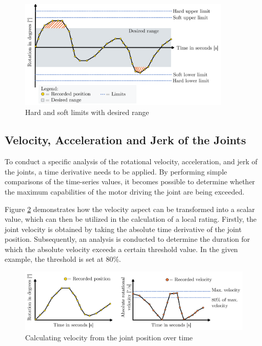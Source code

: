 \begin{figure}[H]
	\centerline{\includegraphics[width=0.9\textwidth]{figures/limits.png}}
	\caption{Hard and soft limits with desired range}
	\label{limits}
\end{figure}

\subsection{Velocity, Acceleration and Jerk of the Joints}\label{VAJJ}
To conduct a specific analysis of the rotational velocity, acceleration, and jerk of the joints, a time derivative needs to be applied. By performing simple comparisons of the time-series values, it becomes possible to determine whether the maximum capabilities of the motor driving the joint are being exceeded.

Figure \ref{velo} demonstrates how the velocity aspect can be transformed into a scalar value, which can then be utilized in the calculation of a local rating. Firstly, the joint velocity is obtained by taking the absolute time derivative of the joint position. Subsequently, an analysis is conducted to determine the duration for which the absolute velocity exceeds a certain threshold value. In the given example, the threshold is set at 80\%. 

\begin{figure}[H]
	\centerline{\includegraphics[width=1\textwidth]{figures/veloy.png}}
	\caption{Calculating velocity from the joint position over time}
	\label{velo}
\end{figure}

